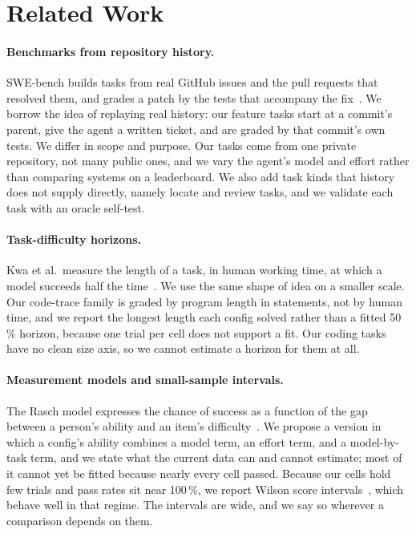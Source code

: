 \section{Related Work}\label{sec:related-work}

\paragraph{Benchmarks from repository history.}
SWE-bench builds tasks from real GitHub issues and the pull requests that resolved them, and grades a patch by the tests that accompany the fix~\cite{jimenez2024swebench}. We borrow the idea of replaying real history: our feature tasks start at a commit's parent, give the agent a written ticket, and are graded by that commit's own tests. We differ in scope and purpose. Our tasks come from one private repository, not many public ones, and we vary the agent's model and effort rather than comparing systems on a leaderboard. We also add task kinds that history does not supply directly, namely locate and review tasks, and we validate each task with an oracle self-test.

\paragraph{Task-difficulty horizons.}
Kwa et al.\ measure the length of a task, in human working time, at which a model succeeds half the time~\cite{kwa2025longtasks}. We use the same shape of idea on a smaller scale. Our code-trace family is graded by program length in statements, not by human time, and we report the longest length each config solved rather than a fitted 50\,\% horizon, because one trial per cell does not support a fit. Our coding tasks have no clean size axis, so we cannot estimate a horizon for them at all.

\paragraph{Measurement models and small-sample intervals.}
The Rasch model expresses the chance of success as a function of the gap between a person's ability and an item's difficulty~\cite{rasch1960probabilistic}. We propose a version in which a config's ability combines a model term, an effort term, and a model-by-task term, and we state what the current data can and cannot estimate; most of it cannot yet be fitted because nearly every cell passed. Because our cells hold few trials and pass rates sit near 100\,\%, we report Wilson score intervals~\cite{wilson1927probable}, which behave well in that regime. The intervals are wide, and we say so wherever a comparison depends on them.

